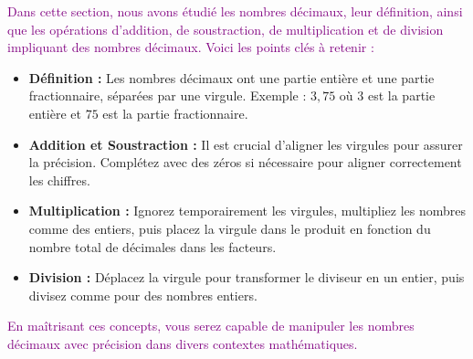 \documentclass{article}
\begin{document}
\begin{tcolorbox}[colback=cyan!10!white, colframe=cyan!80!black, title=\textcolor{black}{Récapitulatif}, sharp corners=southwest]
\textcolor{purple}{Dans cette section, nous avons étudié les nombres décimaux, leur définition, ainsi que les opérations d'addition, de soustraction, de multiplication et de division impliquant des nombres décimaux. Voici les points clés à retenir :}

\begin{itemize}
    \item \textbf{Définition :} Les nombres décimaux ont une partie entière et une partie fractionnaire, séparées par une virgule. Exemple : $3,75$ où $3$ est la partie entière et $75$ est la partie fractionnaire.
    \item \textbf{Addition et Soustraction :} Il est crucial d'aligner les virgules pour assurer la précision. Complétez avec des zéros si nécessaire pour aligner correctement les chiffres.
    \item \textbf{Multiplication :} Ignorez temporairement les virgules, multipliez les nombres comme des entiers, puis placez la virgule dans le produit en fonction du nombre total de décimales dans les facteurs.
    \item \textbf{Division :} Déplacez la virgule pour transformer le diviseur en un entier, puis divisez comme pour des nombres entiers.
\end{itemize}

\textcolor{purple}{En maîtrisant ces concepts, vous serez capable de manipuler les nombres décimaux avec précision dans divers contextes mathématiques.}
\end{tcolorbox}


\vspace{0.35cm}
\end{document}
